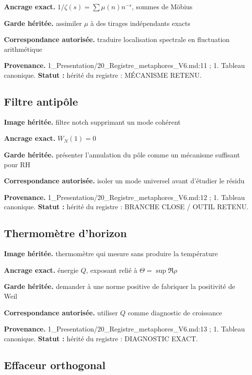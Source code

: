 \documentclass[
  9pt,
  a4paper,
]{article}
\begin{document}
\textbf{Ancrage exact.} \(1/\zeta(s)=\sum \mu(n)n^{-s}\), sommes de
Möbius

\textbf{Garde héritée.} assimiler \(\mu\) à des tirages indépendants
exacts

\textbf{Correspondance autorisée.} traduire localisation spectrale en
fluctuation arithmétique

\textbf{Provenance.} 1\_Presentation/20\_Registre\_metaphores\_V6.md:11
; 1. Tableau canonique. \textbf{Statut :} hérité du registre : MÉCANISME
RETENU.

\hypertarget{filtre-antipuxf4le}{%
\subsection{Filtre antipôle}\label{filtre-antipuxf4le}}

\textbf{Image héritée.} filtre notch supprimant un mode cohérent

\textbf{Ancrage exact.} \(W_N(1)=0\)

\textbf{Garde héritée.} présenter l'annulation du pôle comme un
mécanisme suffisant pour RH

\textbf{Correspondance autorisée.} isoler un mode universel avant
d'étudier le résidu

\textbf{Provenance.} 1\_Presentation/20\_Registre\_metaphores\_V6.md:12
; 1. Tableau canonique. \textbf{Statut :} hérité du registre : BRANCHE
CLOSE / OUTIL RETENU.

\hypertarget{thermomuxe8tre-dhorizon}{%
\subsection{Thermomètre d'horizon}\label{thermomuxe8tre-dhorizon}}

\textbf{Image héritée.} thermomètre qui mesure sans produire la
température

\textbf{Ancrage exact.} énergie \(Q\), exposant relié à
\(\Theta=\sup\Re\rho\)

\textbf{Garde héritée.} demander à une norme positive de fabriquer la
positivité de Weil

\textbf{Correspondance autorisée.} utiliser \(Q\) comme diagnostic de
croissance

\textbf{Provenance.} 1\_Presentation/20\_Registre\_metaphores\_V6.md:13
; 1. Tableau canonique. \textbf{Statut :} hérité du registre :
DIAGNOSTIC EXACT.

\hypertarget{effaceur-orthogonal}{%
\subsection{Effaceur orthogonal}\label{effaceur-orthogonal}}
\end{document}
